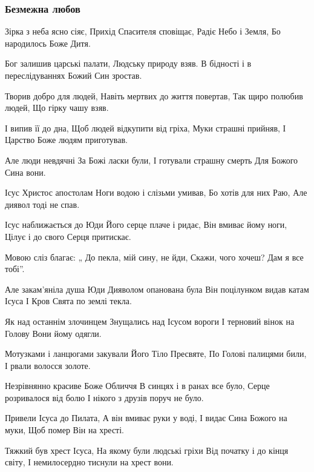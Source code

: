  
 
 

\subsubsection{Безмежна любов}

Зірка з неба ясно сіяє,
Прихід Спасителя сповіщає,
Радіє Небо і Земля,
Бо народилось Боже Дитя.

Бог залишив царські палати,
Людську природу взяв.
В бідності і в переслідуваннях
Божий Син зростав.

Творив добро для людей,
Навіть мертвих до життя повертав,
Так щиро полюбив людей,
Що гірку чашу взяв.

І випив її до дна,
Щоб людей відкупити від гріха,
Муки страшні прийняв,
І Царство Боже людям приготував.

Але люди невдячні
За Божі ласки були,
І готували страшну смерть
Для Божого Сина вони.

Ісус Христос апостолам
Ноги водою і слізьми умивав,
Бо хотів для них Раю,
Але диявол тоді не спав.

Ісус наближається до Юди
Його серце плаче і ридає,
Він вмиває йому ноги,
Цілує і до свого Серця притискає.

Мовою сліз благає:
„ До пекла, мій сину, не йди,
Скажи, чого хочеш?
Дам я все тобі”.

Але закам’яніла душа Юди
Дияволом опанована була
Він поцілунком видав катам Ісуса
І Кров Свята по землі текла.

Як над останнім злочинцем
Знущались над Ісусом вороги
І терновий вінок на Голову
Вони йому одягли.

Мотузками і ланцюгами закували
Його Тіло Пресвяте,
По Голові палицями били,
І рвали волосся золоте.

Незрівнянно красиве Боже Обличчя
В синцях і в ранах все було,
Серце розривалося від болю
І нікого з друзів поруч не було.

Привели Ісуса до Пилата,
А він вмиває руки у воді,
І видає Сина Божого на муки,
Щоб помер Він на хресті.

Тяжкий був хрест Ісуса,
На якому були людські гріхи
Від початку і до кінця світу,
І немилосердно тиснули на хрест вони.


